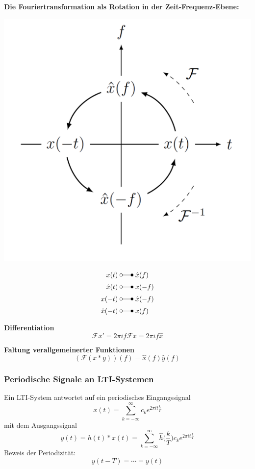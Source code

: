 \textbf{Die Fouriertransformation als Rotation in der Zeit-Frequenz-Ebene:}
\begin{center}
    \includegraphics[width=0.6\linewidth]{img/7.2.1_FT_Rotation.png}
\end{center}
\begin{align*}
    x(t) \;       & \laplace\; \hat{x}(f)  \\
    \hat{x}(t) \; & \laplace\; x(-f)       \\
    x(-t) \;      & \laplace\; \hat{x}(-f) \\
    \hat{x}(-t)\; & \laplace\; x(f)
\end{align*}

\textbf{Differentiation}
\begin{equation}
    \mathcal{F}x'=2\pi if\mathcal{F}x=2\pi if\hat{x}
\end{equation}

\textbf{Faltung verallgemeinerter Funktionen}
\begin{equation}
    (\mathcal{F}(x*y))(f) = \hat{x}(f)\hat{y}(f)
\end{equation}

\subsubsection{Periodische Signale an LTI-Systemen}
Ein LTI-System antwortet auf ein periodisches Eingangssignal
\begin{equation*}
    x(t)=\sum_{k=-\infty}^{\infty}c_k e^{2\pi it\frac{k}{T}}
\end{equation*}
mit dem Ausgangssignal
\begin{equation*}
    y(t)=h(t)*x(t)=\sum_{k=-\infty}^{\infty}\hat{h}\Biggl(\frac{k}{T}\Biggr)c_k e^{2\pi it\frac{k}{T}}
\end{equation*}
Beweis der Periodizität:
\begin{equation*}
    y(t-T)=\cdots=y(t)
\end{equation*}

